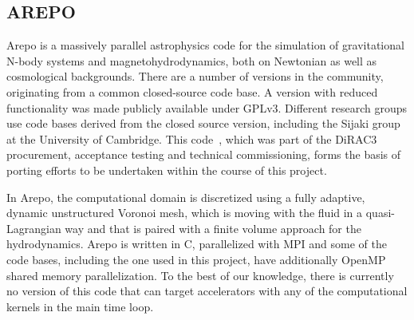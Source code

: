 \documentclass[../main]{subfiles}
\begin{document}
\subsection{AREPO}\label{sec:arepo}
Arepo is a massively parallel astrophysics code for the simulation of gravitational N-body systems and magnetohydrodynamics, both on Newtonian as well as cosmological backgrounds.
There are a number of versions in the community, originating from a common closed-source code base.
A version with reduced functionality was made publicly available under GPLv3\cite{weinberger_arepo_2020, springel_arepo_nodate}.
Different research groups use code bases derived from the closed source version, including the Sijaki group at the University of Cambridge.
This code~\cite{sijaki_arepo_nodate}, which was part of the DiRAC3 procurement, acceptance testing and technical commissioning, forms the basis of porting efforts to be undertaken within the course of this project.

In Arepo, the computational domain is discretized using a fully adaptive, dynamic unstructured Voronoi mesh, which is moving with the fluid in a quasi-Lagrangian way and that is paired with a finite volume approach for the hydrodynamics.
Arepo is written in C, parallelized with MPI and some of the code bases, including the one used in this project, have additionally OpenMP shared memory parallelization.
To the best of our knowledge, there is currently no version of this code that can target accelerators with any of the computational kernels in the main time loop.
\end{document}
